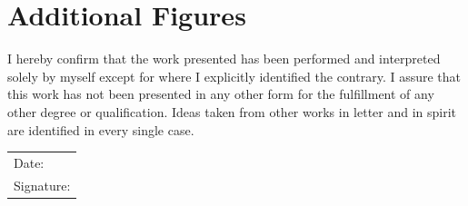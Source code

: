 \documentclass[12pt, a4paper, bibtotoc]{scrartcl}
\theoremstyle{break}
\begin{document}
\clearpage  %
\newpage
\section{Additional Figures}
\label{sec:figures}


\clearpage  %
\newpage
\thispagestyle{empty}  %
\null\vfill            %
\begin{center}
I hereby confirm that the work presented has been performed and interpreted solely by
myself except for where I explicitly identified the contrary. I assure that this work has
not been presented in any other form for the fulfillment of any other degree or
qualification. Ideas taken from other works in letter and in spirit are identified
in every single case.
\end{center}

\vspace{2cm} %

\begin{flushright}
\begin{tabular}{p{8cm}}
Date: \underline{\hspace{3cm}} \\ [1.0ex]
Signature: \underline{\hspace{3cm}}
\end{tabular}
\end{flushright}

\vfill\null
\newpage
\end{document}
